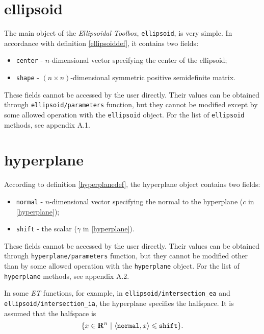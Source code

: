 \section{ellipsoid}
The main object of the {\it Ellipsoidal Toolbox}, {\tt ellipsoid}, is
very simple. In accordance with definition \ref{ellipsoiddef}, it contains
two fields:
\begin{itemize}
\item {\tt center} - $n$-dimensional vector specifying the center
of the ellipsoid;
\item {\tt shape} - $(n\times n)$-dimensional symmetric positive
semidefinite matrix.
\end{itemize}
These fields cannot be accessed by the user directly. Their values
can be obtained through {\tt ellipsoid/parameters} function, but they cannot
be modified except by some allowed operation with the {\tt ellipsoid}
object. For the list of {\tt ellipsoid} methods, see appendix A.1.



\section{hyperplane}
According to  definition \ref{hyperplanedef}, the hyperplane object
contains two fields:
\begin{itemize}
\item {\tt normal} - $n$-dimensional vector specifying the normal to
the hyperplane ($c$ in \ref{hyperplane});
\item {\tt shift} - the scalar ($\gamma$ in \ref{hyperplane}).
\end{itemize}
These fields cannot be accessed by the user directly. Their values
can be obtained through {\tt hyperplane/parameters} function, but they cannot
be modified other than by some allowed operation with the {\tt hyperplane}
object. For the list of {\tt hyperplane} methods, see appendix A.2.

In some {\it ET} functions, for example, in {\tt ellipsoid/intersection\_ea}
and {\tt ellipsoid/intersection\_ia}, the hyperplane specifies the halfspace.
It is assumed that the halfspace is
\[ \{ x\in{\bf R}^n ~|~ \langle{\tt normal},x\rangle\leq{\tt shift}\}. \]



